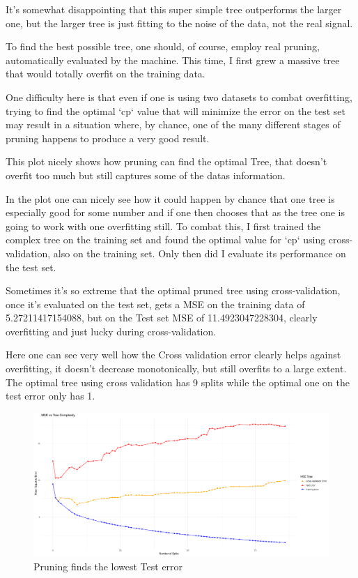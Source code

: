 \documentclass[12pt]{article}
\begin{document}
It's somewhat disappointing that this super simple tree outperforms the larger one, but the larger tree is just fitting to the noise of the data, not the real signal.

To find the best possible tree, one should, of course, employ real pruning, automatically evaluated by the machine. This time, I first grew a massive tree that would totally overfit on the training data.

One difficulty here is that even if one is using two datasets to combat overfitting, trying to find the optimal `cp` value that will minimize the error on the test set may result in a situation where, by chance, one of the many different stages of pruning happens to produce a very good result.



This plot nicely shows how pruning can find the optimal Tree, that doesn't overfit too much but still captures some of the datas information.

In the  plot one can nicely see how it could happen by chance that one tree is especially good for some number and if one then chooses that as the tree one is going to work with one overfitting still.
To combat this, I first trained the complex tree on the training set and found the optimal value for `cp` using cross-validation, also on the training set. Only then did I evaluate its performance on the test set.

Sometimes it's so extreme that the optimal pruned tree using cross-validation, once it's evaluated on the test set, gets a MSE on the training data of 5.27211417154088, but on the Test set MSE of 11.4923047228304, clearly overfitting and just lucky during cross-validation.

Here one can see very well how the Cross validation error clearly helps against overfitting, it doesn't decrease monotonically, but still overfits to a large extent. The optimal tree using cross validation has 9 splits while the optimal one on the test error only has 1.


\begin{figure}
    \centering
    \includegraphics[scale=0.50]{triple_pruning_plot.pdf}
    \caption{Pruning finds the lowest Test error}
\end{figure}
\end{document}
